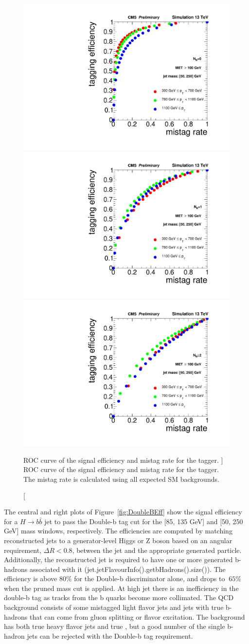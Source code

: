 \begin{figure}
  \begin{center}
    \includegraphics[width=0.32\linewidth]{figs/roc0b.pdf} 
    \includegraphics[width=0.32\linewidth]{figs/roc1b.pdf}
    \includegraphics[width=0.32\linewidth]{figs/roc2b.pdf}
\caption
[ROC curve of the signal efficiency and mistag rate for the \bbbar tagger. ]
{ROC curve of the signal efficiency and mistag rate for the \bbbar tagger. The mistag rate is calculated using all expected SM backgrounds.}
    \label{fig:DoubleBROCBHadrons}
  \end{center}
\end{figure}

The central and right plots of Figure~\ref{fig:DoubleBEff} show the signal efficiency for a $H\rightarrow b\bar{b}$ jet to pass the Double-b tag cut for the [85, 135 GeV] and [50, 250 GeV] mass windows, respectively. The efficiencies are computed by matching reconstructed jets to a generator-level Higgs or Z boson based on an angular requirement, $\Delta R<0.8$, between the jet and the appropriate generated particle. Additionally, the reconstructed jet is required to have one or more generated b-hadrons associated with it (jet.jetFlavourInfo().getbHadrons().size()). The efficiency is above $80\%$ for the Double-b discriminator alone, and drops to $~65\%$ when the pruned mass cut is applied. At high jet \pt there is an inefficiency in the double-b tag as tracks from the b quarks become more collimated. The QCD background consists of some mistagged light flavor jets and jets with true b-hadrons that can come from gluon splitting or flavor excitation. The \ttbar background has both true heavy flavor jets and true \ptmiss, but a good number of the single b-hadron jets can be rejected with the Double-b tag requirement.

